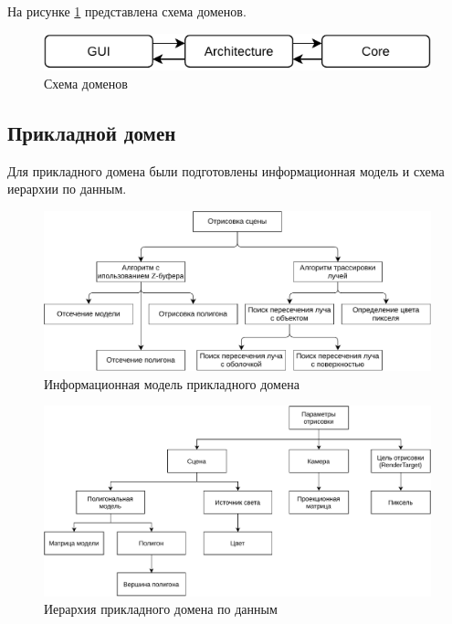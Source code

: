 На рисунке \ref{schema:domen} представлена схема доменов.

\begin{figure}[h]
	\centering
	\includegraphics[width=\linewidth,height=0.85\textheight,keepaspectratio]{diagrams/domens.pdf}
	\caption{Схема доменов}
	\label{schema:domen}
\end{figure}

\subsection{Прикладной домен}

Для прикладного домена были подготовлены информационная модель и схема иерархии по данным.

\begin{figure}[h]
	\centering
	\includegraphics[width=\linewidth,height=0.85\textheight,keepaspectratio]{diagrams/core-info.pdf}
	\caption{Информационная модель прикладного домена}
\end{figure}

\clearpage

\begin{figure}[h]
	\centering
	\includegraphics[width=\linewidth,height=0.85\textheight,keepaspectratio]{diagrams/core-data.pdf}
	\caption{Иерархия прикладного домена по данным}
\end{figure}


